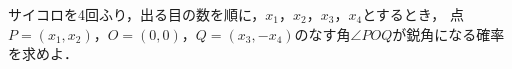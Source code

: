\documentclass[../../main.tex]{subfiles}
\begin{document}
サイコロを4回ふり，出る目の数を順に，$x_1$，$x_2$，$x_3$，$x_4$とするとき，
点$P=(x_1,x_2)$，$O=(0,0)$，$Q=(x_3,-x_4)$のなす角$\angle POQ$が鋭角になる確率を求めよ．
\end{document}
